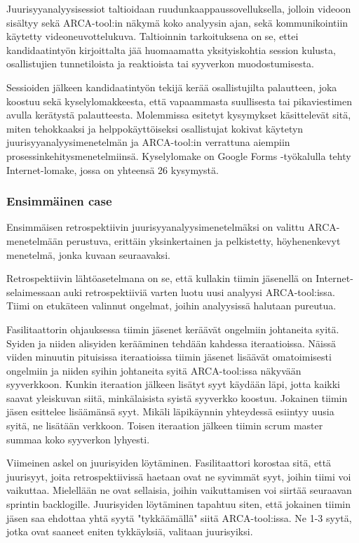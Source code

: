 Juurisyyanalyysisessiot taltioidaan ruudunkaappaussovelluksella, jolloin videoon sisältyy sekä ARCA-tool:in näkymä koko analyysin ajan, sekä kommunikointiin käytetty videoneuvottelukuva. Taltioinnin tarkoituksena on se, ettei kandidaatintyön kirjoittalta jää huomaamatta yksityiskohtia session kulusta, osallistujien tunnetiloista ja reaktioista tai syyverkon muodostumisesta.

Sessioiden jälkeen kandidaatintyön tekijä kerää osallistujilta palautteen, joka koostuu sekä kyselylomakkeesta, että vapaammasta suullisesta tai pikaviestimen avulla kerätystä palautteesta. Molemmissa esitetyt kysymykset käsittelevät sitä, miten tehokkaaksi ja helppokäyttöiseksi osallistujat kokivat käytetyn juurisyyanalyysimenetelmän ja ARCA-tool:in verrattuna aiempiin prosessinkehitysmenetelmiinsä. Kyselylomake on Google Forms -työkalulla tehty Internet-lomake, jossa on yhteensä 26 kysymystä. 

\subsubsection{Ensimmäinen case}
Ensimmäisen retrospektiivin juurisyyanalyysimenetelmäksi on valittu ARCA-menetelmään perustuva, erittäin yksinkertainen ja pelkistetty,  höyhenenkevyt menetelmä, jonka kuvaan seuraavaksi.

Retrospektiivin lähtöasetelmana on se, että kullakin tiimin jäsenellä on Internet-selaimessaan auki retrospektiiviä varten luotu uusi analyysi ARCA-tool:issa. Tiimi on etukäteen valinnut ongelmat, joihin analyysissä halutaan pureutua.

Fasilitaattorin ohjauksessa tiimin jäsenet keräävät ongelmiin johtaneita syitä. Syiden ja niiden alisyiden kerääminen tehdään kahdessa iteraatioissa. Näissä viiden minuutin pituisissa iteraatioissa tiimin jäsenet lisäävät omatoimisesti ongelmiin ja niiden syihin johtaneita syitä ARCA-tool:issa näkyvään syyverkkoon. Kunkin iteraation jälkeen lisätyt syyt käydään läpi, jotta kaikki saavat yleiskuvan siitä, minkälaisista syistä syyverkko koostuu. Jokainen tiimin jäsen esittelee lisäämänsä syyt. Mikäli läpikäynnin yhteydessä esiintyy uusia syitä, ne lisätään verkkoon. Toisen iteraation jälkeen tiimin scrum master summaa koko syyverkon lyhyesti. 

Viimeinen askel on juurisyiden löytäminen. Fasilitaattori korostaa sitä, että juurisyyt, joita retrospektiivissä haetaan ovat ne syvimmät syyt, joihin tiimi voi vaikuttaa. Mielellään ne ovat sellaisia, joihin vaikuttamisen voi siirtää seuraavan sprintin backlogille. Juurisyiden löytäminen tapahtuu siten, että jokainen tiimin jäsen saa ehdottaa yhtä syytä "tykkäämällä" siitä ARCA-tool:issa. Ne 1-3 syytä, jotka ovat saaneet eniten tykkäyksiä, valitaan juurisyiksi.

